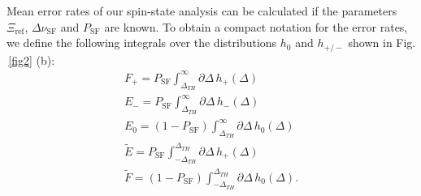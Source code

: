 \documentclass[12pt,preprint%
]{elsarticle}
\begin{document}
Mean error rates of our spin-state analysis can be calculated if the parameters $\Xi_{\mathrm{ref}}$, $\Delta\nu_{\mathrm{SF}}$ and $P_{\mathrm{SF}}$ are known.
To obtain a compact notation for the error rates, we define the following integrals over the distributions $h_0$ and $h_{+/-}$ shown in Fig.$\,$\ref{fig2} (b): 
\begin{eqnarray}
F_+ = P_{\mathrm{SF}} \int_{\Delta_{TH}}^{\infty} \partial\Delta\, h_+(\Delta)\\
E_- = P_{\mathrm{SF}} \int_{\Delta_{TH}}^{\infty} \partial\Delta\, h_-(\Delta)\\
E_0 = (1-P_{\mathrm{SF}}) \int_{\Delta_{TH}}^{\infty} \partial\Delta\, h_0(\Delta)\\
\tilde{E}=P_{\mathrm{SF}} \int_{-\Delta_{TH}}^{\Delta_{TH}} \partial\Delta\, h_+(\Delta)\\
\tilde{F}=(1-P_{\mathrm{SF}}) \int_{-\Delta_{TH}}^{\Delta_{TH}} \partial\Delta\, h_0(\Delta).
\end{eqnarray}
\end{document}
